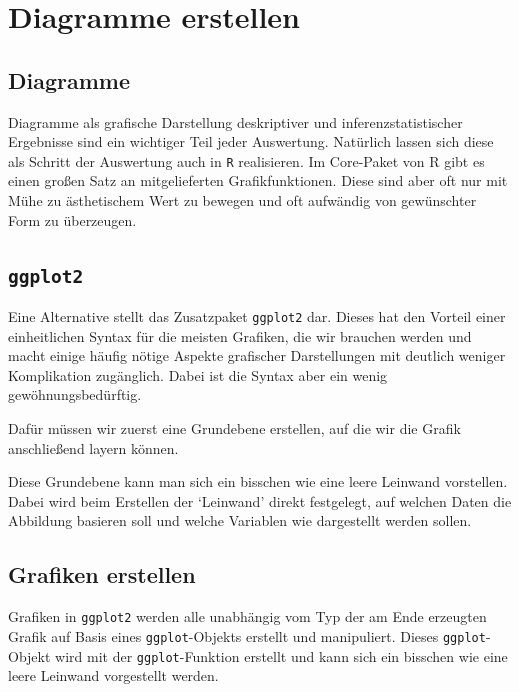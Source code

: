 \documentclass[
]{book}
\begin{document}
\hypertarget{diagramme-erstellen}{%
\section{Diagramme erstellen}\label{diagramme-erstellen}}

\hypertarget{diagramme}{%
\subsection{Diagramme}\label{diagramme}}

Diagramme als grafische Darstellung deskriptiver und inferenzstatistischer Ergebnisse sind ein wichtiger Teil jeder Auswertung. Natürlich lassen sich diese als Schritt der Auswertung auch in \texttt{R} realisieren. Im Core-Paket von R gibt es einen großen Satz an mitgelieferten Grafikfunktionen. Diese sind aber oft nur mit Mühe zu ästhetischem Wert zu bewegen und oft aufwändig von gewünschter Form zu überzeugen.

\hypertarget{ggplot2}{%
\subsection{\texorpdfstring{\texttt{ggplot2}}{ggplot2}}\label{ggplot2}}

Eine Alternative stellt das Zusatzpaket \texttt{ggplot2} dar. Dieses hat den Vorteil einer einheitlichen Syntax für die meisten Grafiken, die wir brauchen werden und macht einige häufig nötige Aspekte grafischer Darstellungen mit deutlich weniger Komplikation zugänglich. Dabei ist die Syntax aber ein wenig gewöhnungsbedürftig.

Dafür müssen wir zuerst eine Grundebene erstellen, auf die wir die Grafik anschließend layern können.

Diese Grundebene kann man sich ein bisschen wie eine leere Leinwand vorstellen.
Dabei wird beim Erstellen der `Leinwand' direkt festgelegt, auf welchen Daten die Abbildung basieren soll und welche Variablen wie dargestellt werden sollen.

\hypertarget{grafiken-erstellen}{%
\subsection{Grafiken erstellen}\label{grafiken-erstellen}}

Grafiken in \texttt{ggplot2} werden alle unabhängig vom Typ der am Ende erzeugten Grafik auf Basis eines \texttt{ggplot}-Objekts erstellt und manipuliert. Dieses \texttt{ggplot}-Objekt wird mit der \texttt{ggplot}-Funktion erstellt und kann sich ein bisschen wie eine leere Leinwand vorgestellt werden.
\end{document}
